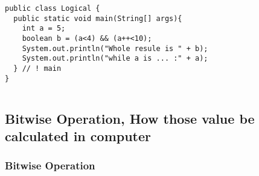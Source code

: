 \documentclass[
  11pt, %
  xcolor=dvipsnames
]{beamer}
\begin{document}
\begin{frame}[fragile]


	\begin{columns}[c]
		\begin{column}{0.9\textwidth}

			\begin{lstlisting}[style=Java]
public class Logical {
  public static void main(String[] args){
    int a = 5;
    boolean b = (a<4) && (a++<10);
    System.out.println("Whole resule is " + b);
    System.out.println("while a is ... :" + a);
  } // ! main
}
      \end{lstlisting}

		\end{column}
	\end{columns}

\end{frame}

\subsection{Bitwise Operation, How those value be calculated in computer}
\begin{frame}[fragile]
	\frametitle{Bitwise Operation}


	\begin{columns}[c]
		\begin{column}{0.9\textwidth}


		\end{column}
	\end{columns}

\end{frame}
\end{document}

